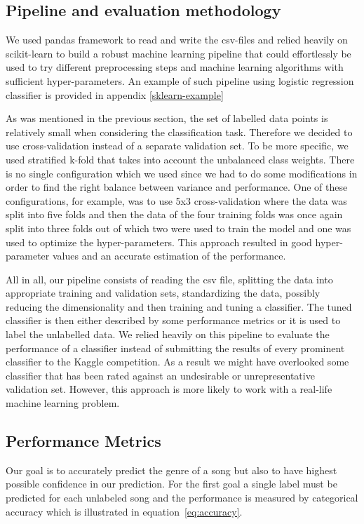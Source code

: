 \documentclass[fleqn,10pt]{SelfArx} %
\begin{document}
\subsection{Pipeline and evaluation methodology}

We used pandas framework to read and write the csv-files and relied
heavily on scikit-learn to build a robust machine learning pipeline that could
effortlessly be used to try different preprocessing steps and machine learning
algorithms with sufficient hyper-parameters. An example of such pipeline using
logistic regression classifier is provided in appendix \ref{sklearn-example}

As was mentioned in the previous section, the set of labelled data points is
relatively small when considering the classification task. Therefore we decided
to use cross-validation instead of a separate validation set. To be more
specific, we used stratified k-fold that takes into account the
unbalanced class weights. There is no single configuration which we used since we
had to do some modifications in order to find the right balance between variance
and performance. One of these configurations, for example, was to use 5x3
cross-validation where the data was split into five folds and then the data of
the four training
folds was once again split into three folds out of which two were used to train the
model and one was used to optimize the hyper-parameters. This approach resulted
in good hyper-parameter values and an accurate estimation of the performance.

All in all, our pipeline consists of reading the csv file, splitting the data into
appropriate training and validation sets, standardizing the data, possibly reducing
the dimensionality and then training and tuning a classifier. The tuned
classifier is then either described by some performance metrics or it is used to
label the unlabelled data. We relied heavily on this pipeline to evaluate the
performance of a classifier instead of submitting the results of every
prominent classifier to the Kaggle competition. As a result we might have
overlooked some classifier that has been rated against an undesirable or
unrepresentative validation set. However, this approach is more likely to work
with a real-life machine learning problem.

\subsection{Performance Metrics}

Our goal is to accurately predict the genre of a song but also to have highest
possible confidence in our prediction. For the first goal a single label must be
predicted for each unlabeled song and the performance is measured by categorical
accuracy which is illustrated in equation~\ref{eq:accuracy}.
\end{document}
